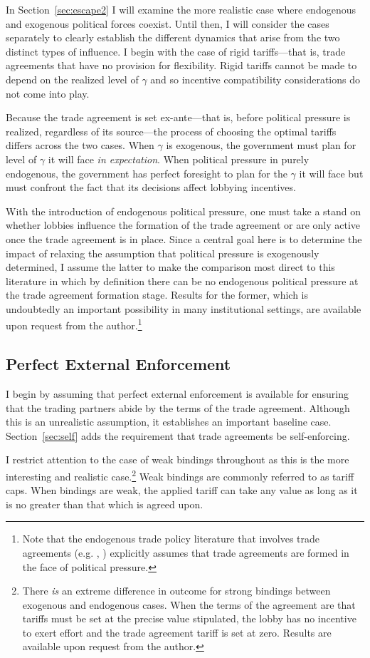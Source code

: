 \documentclass[12pt,titlepage]{article}
\newcommand{\ga}{\gamma}
\begin{document}
In Section~\ref{sec:escape2} I will examine the more realistic case where endogenous and exogenous political forces coexist. Until then, I will consider the cases separately to clearly establish the different dynamics that arise from the two distinct types of influence. I begin with the case of rigid tariffs---that is, trade agreements that have no provision for flexibility. Rigid tariffs cannot be made to depend on the realized level of $\ga$ and so incentive compatibility considerations do not come into play.

Because the trade agreement is set ex-ante---that is, before political pressure is realized, regardless of its source---the process of choosing the optimal tariffs differs across the two cases. When $\ga$ is exogenous, the government must plan for level of $\ga$ it will face \textit{in expectation}. When political pressure in purely endogenous, the government has perfect foresight to plan for the $\ga$ it will face but must confront the fact that its decisions affect lobbying incentives.

With the introduction of endogenous political pressure, one must take a stand on whether lobbies influence the formation of the trade agreement or are only active once the trade agreement is in place. Since a central goal here is to determine the impact of relaxing the assumption that political pressure is exogenously determined, I assume the latter to make the comparison most direct to this literature in which by definition there can be no endogenous political pressure at the trade agreement formation stage. Results for the former, which is undoubtedly an important possibility in many institutional settings, are available upon request from the author.\footnote{Note that the endogenous trade policy literature that involves trade agreements (e.g. \Textcite{gh95}, \Textcite{mrc2007}) explicitly assumes that trade agreements are formed in the face of political pressure.}


\subsection{Perfect External Enforcement}
\label{sec:perfect}
I begin by assuming that perfect external enforcement is available for ensuring that the trading partners abide by the terms of the trade agreement. Although this is an unrealistic assumption, it establishes an important baseline case. Section~\ref{sec:self} adds the requirement that trade agreements be self-enforcing.

I restrict attention to the case of weak bindings throughout as this is the more interesting and realistic case.\footnote{There \textit{is} an extreme difference in outcome for strong bindings between exogenous and endogenous cases. When the terms of the agreement are that tariffs must be set at the precise value stipulated, the lobby has no incentive to exert effort and the trade agreement tariff is set at zero. Results are available upon request from the author.} Weak bindings are commonly referred to as tariff caps. When bindings are weak, the applied tariff can take any value as long as it is no greater than that which is agreed upon.
\end{document}
